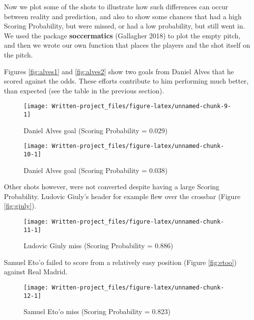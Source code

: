 \documentclass[]{article}
\begin{document}
Now we plot some of the shots to illustrate how such differences can
occur between reality and prediction, and also to show some chances that
had a high Scoring Probability, but were missed, or had a low
probability, but still went in. We used the package
\textbf{soccermatics} (Gallagher 2018) to plot the empty pitch, and then
we wrote our own function that places the players and the shot itself on
the pitch.

Figures \ref{fig:alves1} and \ref{fig:alves2} show two goals from Daniel
Alves that he scored against the odds. These efforts contribute to him
performing much better, than expected (see the table in the previous
section).

\begin{figure}[!h]

{\centering \texttt{[image: Written-project\_files/figure-latex/unnamed-chunk-9-1]} 

}

\caption{\label{fig:alves1} Daniel Alves goal (Scoring Probability =  0.029)}\label{fig:unnamed-chunk-9}
\end{figure}

\begin{figure}[!h]

{\centering \texttt{[image: Written-project\_files/figure-latex/unnamed-chunk-10-1]} 

}

\caption{\label{fig:alves2} Daniel Alves goal (Scoring Probability =  0.038)}\label{fig:unnamed-chunk-10}
\end{figure}

\newpage

Other shots however, were not converted despite having a large Scoring
Probability. Ludovic Giuly's header for example flew over the crossbar
(Figure \ref{fig:giuly}).

\begin{figure}[!h]

{\centering \texttt{[image: Written-project\_files/figure-latex/unnamed-chunk-11-1]} 

}

\caption{\label{fig:giuly} Ludovic Giuly miss (Scoring Probability =  0.886)}\label{fig:unnamed-chunk-11}
\end{figure}

Samuel Eto'o failed to score from a relatively easy position (Figure
\ref{fig:etoo}) against Real Madrid.

\begin{figure}[!h]

{\centering \texttt{[image: Written-project\_files/figure-latex/unnamed-chunk-12-1]} 

}

\caption{\label{fig:etoo} Samuel Eto'o miss (Scoring Probability =  0.823)}\label{fig:unnamed-chunk-12}
\end{figure}
\end{document}
